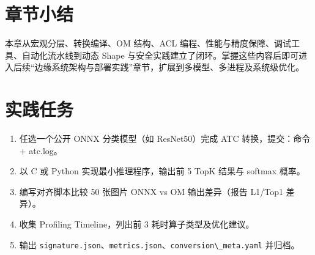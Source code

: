 \section{章节小结}\label{src-book-chapter2-h17}

本章从宏观分层、转换编译、OM 结构、ACL
编程、性能与精度保障、调试工具、自动化流水线到动态 Shape
与安全实践建立了闭环。掌握这些内容后即可进入后续``边缘系统架构与部署实践''章节，扩展到多模型、多进程及系统级优化。

\section{实践任务}\label{src-book-chapter2-h18}

\begin{enumerate}
\def\labelenumi{\arabic{enumi}.}
\tightlist
\item
  任选一个公开 ONNX 分类模型（如 ResNet50）完成 ATC 转换，提交：命令 +
  atc.log。
\item
  以 C 或 Python 实现最小推理程序，输出前 5 TopK 结果与 softmax 概率。
\item
  编写对齐脚本比较 50 张图片 ONNX vs OM 输出差异（报告 L1/Top1 差异）。
\item
  收集 Profiling Timeline，列出前 3 耗时算子类型及优化建议。
\item
  输出
  \passthrough{\lstinline!signature.json!}、\passthrough{\lstinline!metrics.json!}、\passthrough{\lstinline!conversion\_meta.yaml!}
  并归档。
\end{enumerate}
